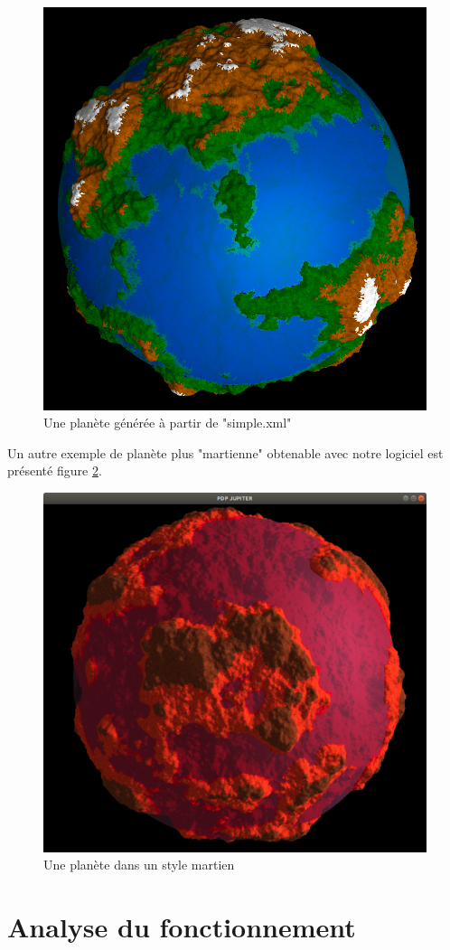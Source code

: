 \documentclass[a4paper]{article}
\begin{document}
\begin{figure}[!ht]
    \begin{center}
        \includegraphics[width=0.6\linewidth]{img/notre_planete.png} 
        \caption{Une planète générée à partir de "simple.xml"}
        \label{notre_planete}
    \end{center}
\end{figure}

Un autre exemple de planète plus "martienne" obtenable avec notre logiciel est présenté figure \ref{notre_planete_mars}.

\begin{figure}[!ht]
    \begin{center}
        \includegraphics[width=0.6\linewidth]{img/notre_planete_mars.png} 
        \caption{Une planète dans un style martien}
        \label{notre_planete_mars}
    \end{center}
\end{figure}

\newpage 
\section{Analyse du fonctionnement}
\end{document}
